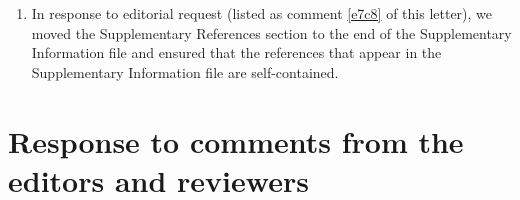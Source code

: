 \documentclass[11pt,letterpaper]{report}
\begin{document}
\begin{enumerate}[label=\textit{Ec.\arabic*}]

\item \label{Supplementary7} In response to editorial request (listed as comment \ref{e7c8} of this letter), we moved the Supplementary References section to the end of the Supplementary Information file and ensured that the references that appear in the Supplementary Information file are self-contained.






%
\end{enumerate}

\clearpage

\section*{Response to comments from the editors and reviewers}
\end{document}
